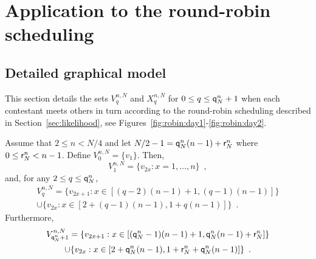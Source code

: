\appendix 


\section{Application to the round-robin scheduling}
\label{sec:round:robin}
\subsection{Detailed graphical model}
This section details the sets $V_q^{n,N}$ and $X_q^{n,N}$ for $0\le q\le {\mathsf{q}}^{n}_{N}+1$ when each contestant meets others in turn according to  the round-robin scheduling described in Section~\ref{sec:likelihood}, see Figures~\ref{fig:robin:day1}-\ref{fig:robin:day2}.

\begin{lemma}\label{lem:ElementsAtDistanceq} Assume that $2\le n<N/4$ and let $N/2-1= {\mathsf{q}}^{n}_{N}(n-1)+{\mathsf{r}}^{n}_{N}$ where $0\le {\mathsf{r}}^{n}_{N}<n-1$. Define $V_{0}^{n,N}=\{v_1\}$. Then, 
\begin{equation}\label{def:V1}
V_{1}^{n,N}=\{v_{2x} : x=1,\ldots,n\}\enspace, 
\end{equation}
and, for any $2\le q \le {\mathsf{q}}^{n}_{N}$, 
\begin{multline}\label{def:Vq}
V_{q}^{n,N}=\{v_{2x+1} : x\in[(q-2)(n-1)+1,(q-1)(n-1)]\}\\
\cup\{v_{2x} : x\in[2+(q-1)(n-1),1+q(n-1)]\}\enspace.
\end{multline}
Furthermore,
\begin{multline}\label{def:Vq01'}
V_{{\mathsf{q}}^{n}_{N}+1}^{n,N}=\{v_{2x+1} : x\in[({\mathsf{q}}^{n}_{N}-1)(n-1)+1,{\mathsf{q}}^{n}_{N}(n-1)+{\mathsf{r}}^{n}_{N}]\}\\
\cup\{v_{2x} : x\in[2+{\mathsf{q}}^{n}_{N}(n-1),1+{\mathsf{r}}^{n}_{N}+{\mathsf{q}}^{n}_{N}(n-1)]\}\enspace.
\end{multline}
\end{lemma}
